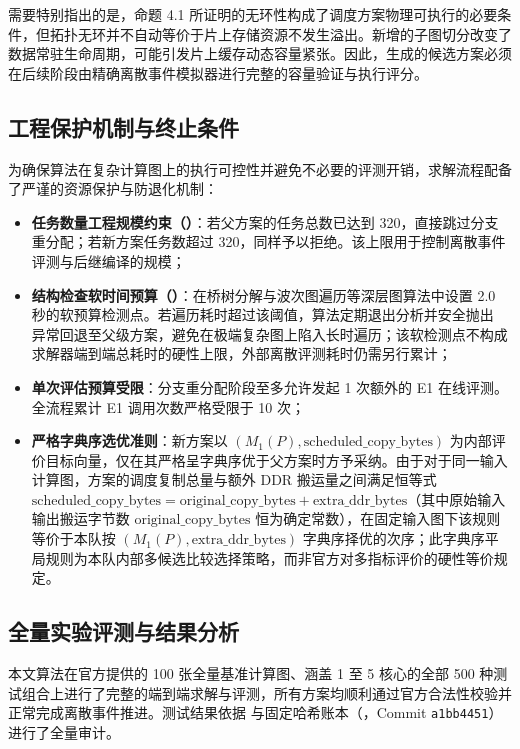 \documentclass[anonymous,withtoc]{gmcm2026}
\providecommand{\tightlist}{\setlength{\itemsep}{0pt}\setlength{\parskip}{0pt}}
\begin{document}
需要特别指出的是，命题 4.1 所证明的无环性构成了调度方案物理可执行的必要条件，但拓扑无环并不自动等价于片上存储资源不发生溢出。新增的子图切分改变了数据常驻生命周期，可能引发片上缓存动态容量紧张。因此，生成的候选方案必须在后续阶段由精确离散事件模拟器进行完整的容量验证与执行评分。

\subsection{工程保护机制与终止条件}

为确保算法在复杂计算图上的执行可控性并避免不必要的评测开销，求解流程配备了严谨的资源保护与防退化机制：

\begin{itemize}
\tightlist
\item
  \textbf{任务数量工程规模约束（\texttt{}）}：若父方案的任务总数已达到 320，直接跳过分支重分配；若新方案任务数超过 320，同样予以拒绝。该上限用于控制离散事件评测与后继编译的规模；
\item
  \textbf{结构检查软时间预算（\texttt{}）}：在桥树分解与波次图遍历等深层图算法中设置 2.0 秒的软预算检测点。若遍历耗时超过该阈值，算法定期退出分析并安全抛出 \texttt{} 异常回退至父级方案，避免在极端复杂图上陷入长时遍历；该软检测点不构成求解器端到端总耗时的硬性上限，外部离散评测耗时仍需另行累计；
\item
  \textbf{单次评估预算受限}：分支重分配阶段至多允许发起 1 次额外的 E1 在线评测。全流程累计 E1 调用次数严格受限于 10 次；
\item
  \textbf{严格字典序选优准则}：新方案以 \((M_1(P), \text{scheduled\_copy\_bytes})\) 为内部评价目标向量，仅在其严格呈字典序优于父方案时方予采纳。由于对于同一输入计算图，方案的调度复制总量与额外 DDR 搬运量之间满足恒等式 \(\text{scheduled\_copy\_bytes} = \text{original\_copy\_bytes} + \text{extra\_ddr\_bytes}\)（其中原始输入输出搬运字节数 \(\text{original\_copy\_bytes}\) 恒为确定常数），在固定输入图下该规则等价于本队按 \((M_1(P), \text{extra\_ddr\_bytes})\) 字典序择优的次序；此字典序平局规则为本队内部多候选比较选择策略，而非官方对多指标评价的硬性等价规定。
\end{itemize}

\subsection{全量实验评测与结果分析}

本文算法在官方提供的 100 张全量基准计算图、涵盖 1 至 5 核心的全部 500 种测试组合上进行了完整的端到端求解与评测，所有方案均顺利通过官方合法性校验并正常完成离散事件推进。测试结果依据 \texttt{} 与固定哈希账本（\texttt{}，Commit \texttt{a1bb4451}）进行了全量审计。
\end{document}
